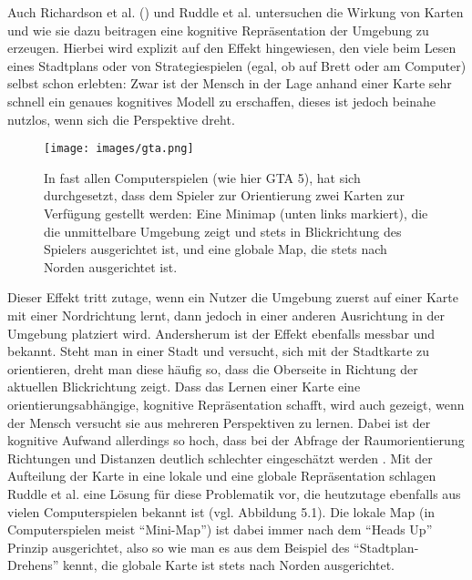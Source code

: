 Auch Richardson et al. (\cite{Richardson1999}) und Ruddle et al. \cite{Ruddle1999TheEnvironments} untersuchen die Wirkung von Karten und wie sie dazu beitragen eine kognitive Repräsentation der Umgebung zu erzeugen.
Hierbei wird explizit auf den Effekt hingewiesen, den viele beim Lesen eines Stadtplans oder von Strategiespielen (egal, ob auf Brett oder am Computer) selbst schon erlebten: Zwar ist der Mensch in der Lage anhand einer Karte sehr schnell ein genaues kognitives Modell zu erschaffen, dieses ist jedoch beinahe nutzlos, wenn sich die Perspektive dreht.


\begin{figure}[h]
  \centering
  \texttt{[image: images/gta.png]}
  \caption{In fast allen Computerspielen (wie hier GTA 5), hat sich durchgesetzt, dass dem Spieler zur Orientierung zwei Karten zur Verfügung gestellt werden: Eine Minimap (unten links markiert), die die unmittelbare Umgebung zeigt und stets in Blickrichtung des Spielers ausgerichtet ist, und eine globale Map, die stets nach Norden ausgerichtet ist.}
  \label{fig:todo}
\end{figure}

Dieser Effekt tritt zutage, wenn ein Nutzer die Umgebung zuerst auf einer Karte mit einer Nordrichtung lernt, dann jedoch in einer anderen Ausrichtung in der Umgebung platziert wird. Andersherum ist der Effekt ebenfalls messbar und bekannt. Steht man in einer Stadt und versucht, sich mit der Stadtkarte zu orientieren, dreht man diese häufig so, dass die Oberseite in Richtung der aktuellen Blickrichtung zeigt. Dass das Lernen einer Karte eine orientierungsabhängige, kognitive Repräsentation schafft, wird auch gezeigt, wenn der Mensch versucht sie aus mehreren Perspektiven zu lernen. Dabei ist der kognitive Aufwand allerdings so hoch, dass bei der Abfrage der Raumorientierung Richtungen und Distanzen deutlich schlechter eingeschätzt werden \cite{Richardson1999}.
Mit der Aufteilung der Karte in eine lokale und eine globale Repräsentation schlagen Ruddle et al. \cite{Ruddle1999TheEnvironments} eine Lösung für diese Problematik vor, die heutzutage ebenfalls aus vielen Computerspielen bekannt ist (vgl. Abbildung 5.1). Die lokale Map (in Computerspielen meist “Mini-Map”) ist dabei immer nach dem “Heads Up” Prinzip ausgerichtet, also so wie man es aus dem Beispiel des “Stadtplan-Drehens” kennt, die globale Karte ist stets nach Norden ausgerichtet.

